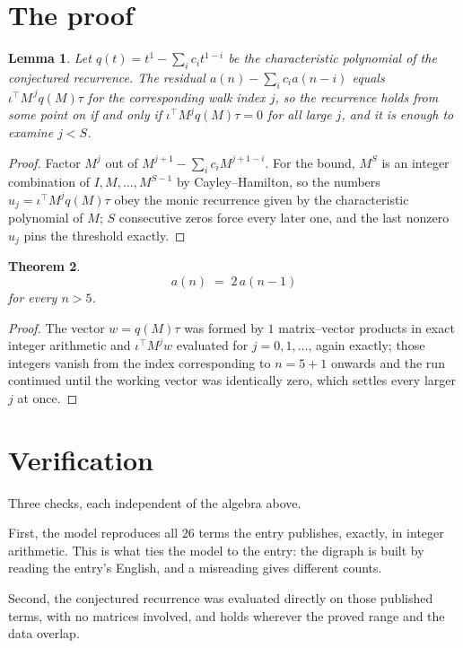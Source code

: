 \documentclass[11pt,a4paper]{article}
\theoremstyle{plain}
\newtheorem{theorem}{Theorem}
\newtheorem{lemma}[theorem]{Lemma}
\theoremstyle{definition}
\begin{document}
\section{The proof}

\begin{lemma}\label{lem:crit}
Let $q(t)=t^{1}-\sum_i c_it^{1-i}$ be the characteristic polynomial of the
conjectured recurrence. The residual $a(n)-\sum_ic_ia(n-i)$ equals
$\iota^{\!\top}M^{\,j}q(M)\tau$ for the corresponding walk index $j$, so the recurrence
holds from some point on if and only if $\iota^{\!\top}M^{j}q(M)\tau=0$ for all large $j$,
and it is enough to examine $j<S$.
\end{lemma}

\begin{proof}
Factor $M^{j}$ out of $M^{j+1}-\sum_ic_iM^{j+1-i}$. For the bound, $M^{S}$
is an integer combination of $I,M,\dots,M^{S-1}$ by Cayley--Hamilton, so the numbers
$u_j=\iota^{\!\top}M^{j}q(M)\tau$ obey the monic recurrence given by the characteristic
polynomial of $M$; $S$ consecutive zeros force every later one, and the last nonzero $u_j$
pins the threshold exactly.
\end{proof}

\begin{theorem}
\[
a(n)\;=\;2\,a(n-1)
\]
for every $n>5$.
\end{theorem}

\begin{proof}
The vector $w=q(M)\tau$ was formed by $1$ matrix--vector products in exact integer
arithmetic and $\iota^{\!\top}M^{j}w$ evaluated for $j=0,1,\dots$, again exactly; those
integers vanish from the index corresponding to $n=5+1$ onwards and the run continued
until the working vector was identically zero, which settles every larger $j$ at once.
\end{proof}

\section{Verification}

Three checks, each independent of the algebra above.

First, the model reproduces all $26$ terms the entry publishes, exactly, in integer
arithmetic. This is what ties the model to the entry: the digraph is built by reading the
entry's English, and a misreading gives different counts.

Second, the conjectured recurrence was evaluated directly on those published terms, with no
matrices involved, and holds wherever the proved range and the data overlap.
\end{document}
